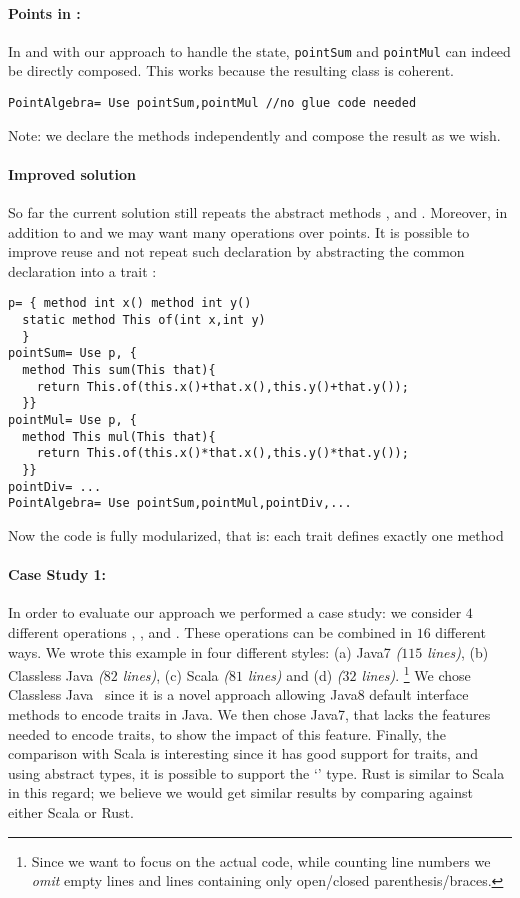 \paragraph{Points in \name:}
In \name and with our approach to handle the state, 
\lstinline{pointSum} and \lstinline{pointMul} can indeed be directly composed.
This works because the resulting class is coherent.
\saveSpace\saveSpace
\begin{lstlisting}
PointAlgebra= Use pointSum,pointMul //no glue code needed
\end{lstlisting}  
\saveSpace\saveSpace
\noindent
  Note: we declare the methods independently and compose the result
  as we wish. 

  \paragraph{Improved solution} So far the current solution still
  repeats the abstract methods \Q@x@, \Q@y@ and \Q@of@.
  Moreover, in addition to \Q@sum@ and \Q@mul@ we may want many
  operations over points. It is possible to improve reuse
  and not repeat such declaration by abstracting the common
  declaration into a trait \Q@p@: 
\saveSpace\saveSpace
\begin{lstlisting}
p= { method int x() method int y()
  static method This of(int x,int y)
  }
pointSum= Use p, { 
  method This sum(This that){
    return This.of(this.x()+that.x(),this.y()+that.y());
  }}
pointMul= Use p, { 
  method This mul(This that){
    return This.of(this.x()*that.x(),this.y()*that.y());
  }}
pointDiv= ...
PointAlgebra= Use pointSum,pointMul,pointDiv,...
\end{lstlisting}
\saveSpace\saveSpace      
Now the code is fully modularized, that is: each trait defines exactly one method 

\paragraph{Case Study 1:}
In order to evaluate our approach
we performed a case study:
we consider $4$ different operations \Q@Sum@, \Q@Subtraction@, \Q@Multiplication@ and \Q@Division@.
These operations can be combined in $16$ different ways.
We wrote this example in four different styles:
(a) Java7 \emph{($115$ lines)},
(b) Classless Java \emph{($82$ lines)},
(c) Scala \emph{($81$ lines)} and (d) \name \emph{($32$ lines)}.%
\footnote{
Since we want to focus on the actual code, while counting line numbers we \emph{omit} empty lines and lines containing only open/closed
parenthesis/braces.
}
We chose Classless Java~\cite{wang2016classless} since it is a novel approach allowing
Java8 default interface methods to encode traits in Java.
We then chose Java7, that lacks the features needed to encode traits, to show the impact of this feature.
Finally, the comparison with Scala is interesting 
since
it has good support for traits, and using abstract types, it is possible to support the `\Q@This@' type.
Rust is similar to Scala in this regard; we believe we would get similar results by comparing against either Scala or Rust.

